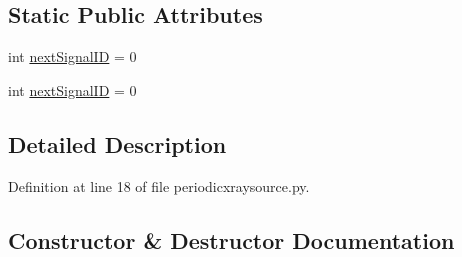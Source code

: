 \subsection*{Static Public Attributes}
\begin{DoxyCompactItemize}
\item 
int \hyperlink{classmodest_1_1signals_1_1signalsource_1_1SignalSource_a453eafb550b551adbec0903deb63dfce}{next\+Signal\+ID} = 0
\item 
int \hyperlink{classmodest_1_1signals_1_1signalsource_1_1SignalSource_a453eafb550b551adbec0903deb63dfce}{next\+Signal\+ID} = 0
\end{DoxyCompactItemize}


\subsection{Detailed Description}


Definition at line 18 of file periodicxraysource.\+py.



\subsection{Constructor \& Destructor Documentation}
